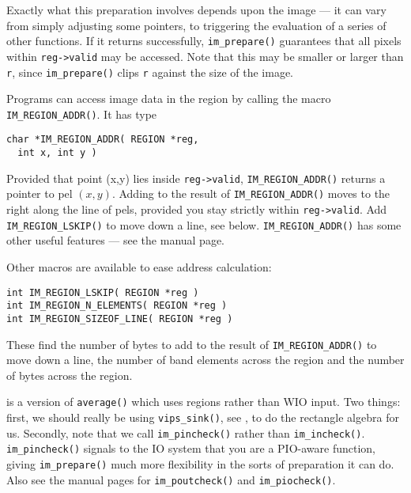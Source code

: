 Exactly what this preparation involves depends upon the image --- it can
vary from simply adjusting some pointers, to triggering the evaluation of a
series of other functions. If it returns successfully, \verb+im_prepare()+
guarantees that all pixels within \verb+reg->valid+ may be accessed. Note
that this may be smaller or larger than \verb+r+, since \verb+im_prepare()+
clips \verb+r+ against the size of the image.

Programs can access image data in the region by calling the macro
\verb+IM_REGION_ADDR()+. It has type

\begin{verbatim}
char *IM_REGION_ADDR( REGION *reg, 
  int x, int y ) 
\end{verbatim}

Provided that point (x,y) lies inside \verb+reg->valid+,
\verb+IM_REGION_ADDR()+ returns a pointer to pel $(x,y)$. Adding to the result
of \verb+IM_REGION_ADDR()+ moves to the right along the line of pels, provided
you stay strictly within \verb+reg->valid+. Add \verb+IM_REGION_LSKIP()+
to move down a line, see below. \verb+IM_REGION_ADDR()+ has some other
useful features --- see the manual page.

Other macros are available to ease address calculation:

\begin{verbatim}
int IM_REGION_LSKIP( REGION *reg )
int IM_REGION_N_ELEMENTS( REGION *reg )
int IM_REGION_SIZEOF_LINE( REGION *reg )
\end{verbatim}

\noindent
These find the number of bytes to add to the result of \verb+IM_REGION_ADDR()+
to move down a line, the number of band elements across the region and the
number of bytes across the region.

 is a version of \verb+average()+ which uses
regions rather than WIO input. Two things: first, we should really be
using \verb+vips_sink()+, see , to do the rectangle
algebra for us. Secondly, note that we call \verb+im_pincheck()+ rather
than \verb+im_incheck()+. \verb+im_pincheck()+ signals to the IO system
that you are a PIO-aware function, giving \verb+im_prepare()+ much more
flexibility in the sorts of preparation it can do. Also see the manual
pages for \verb+im_poutcheck()+ and \verb+im_piocheck()+.

